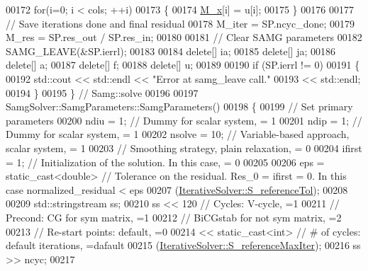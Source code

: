 \begin{DoxyCode}
00172     \textcolor{keywordflow}{for}(i=0; i < cols; ++i)
00173     \{
00174         \hyperlink{classFVCode3D_1_1Solver_a6414eabf461e95a8fc5b8a49bb06e8cb}{M\_x}[i] = u[i];
00175     \}
00176 
00177     \textcolor{comment}{// Save iterations done and final residual}
00178     M\_iter = SP.ncyc\_done;
00179     M\_res = SP.res\_out / SP.res\_in;
00180 
00181     \textcolor{comment}{// Clear SAMG parameters}
00182     SAMG\_LEAVE(&SP.ierrl);
00183 
00184     \textcolor{keyword}{delete}[] ia;
00185     \textcolor{keyword}{delete}[] ja;
00186     \textcolor{keyword}{delete}[] a;
00187     \textcolor{keyword}{delete}[] f;
00188     \textcolor{keyword}{delete}[] u;
00189 
00190     \textcolor{keywordflow}{if} (SP.ierrl != 0)
00191     \{
00192         std::cout << std::endl << \textcolor{stringliteral}{"Error at samg\_leave call."}
00193                   << std::endl;
00194     \}
00195 \} \textcolor{comment}{// Samg::solve}
00196 
00197 SamgSolver::SamgParameters::SamgParameters()
00198 \{
00199     \textcolor{comment}{// Set primary parameters}
00200     ndiu      = 1;      \textcolor{comment}{// Dummy for scalar system, = 1}
00201     ndip      = 1;      \textcolor{comment}{// Dummy for scalar system, = 1}
00202     nsolve    = 10;     \textcolor{comment}{// Variable-based approach, scalar system, = 1}
00203                         \textcolor{comment}{// Smoothing strategy, plain relaxation, = 0}
00204     ifirst    = 1;      \textcolor{comment}{// Initialization of the solution. In this case, = 0}
00205 
00206     eps       = \textcolor{keyword}{static\_cast<}\textcolor{keywordtype}{double}\textcolor{keyword}{>} \textcolor{comment}{// Tolerance on the residual. Res\_0 = ifirst = 0. In this case
       normalized\_residual < eps}
00207                 (\hyperlink{classFVCode3D_1_1IterativeSolver_a2afd68f254311907309444138d7f1b89}{IterativeSolver::S\_referenceTol});
00208 
00209     std::stringstream ss;
00210     ss << 120           \textcolor{comment}{// Cycles: V-cycle, =1}
00211                         \textcolor{comment}{// Precond: CG for sym matrix, =1}
00212                         \textcolor{comment}{//          BiCGstab for not sym matrix, =2}
00213                         \textcolor{comment}{// Re-start points: default, =0}
00214        << \textcolor{keyword}{static\_cast<}\textcolor{keywordtype}{int}\textcolor{keyword}{>}  \textcolor{comment}{// # of cycles: default iterations, =dafault}
00215           (\hyperlink{classFVCode3D_1_1IterativeSolver_a938effdbfaa21c23226bfedf904787c2}{IterativeSolver::S\_referenceMaxIter});
00216     ss >> ncyc;
00217 

\end{DoxyCode}

